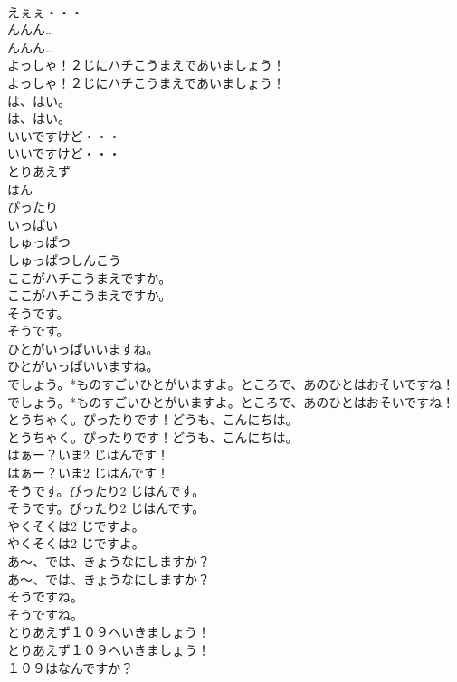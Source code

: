 \documentclass[8pt]{extreport}
\begin{document}
\begin{CJK}{UTF8}{min}
\\	えぇぇ・・・ 
\\	んんん…	
\\	んんん… 
\\	よっしゃ！２じにハチこうまえであいましょう！	
\\	よっしゃ！２じにハチこうまえであいましょう！ 
\\	は、はい。	
\\	は、はい。 
\\	いいですけど・・・	
\\	いいですけど・・・ 
\\	とりあえず
\\	はん
\\	ぴったり
\\	いっぱい
\\	しゅっぱつ
\\	しゅっぱつしんこう
\\	ここがハチこうまえですか。	
\\	ここがハチこうまえですか。 
\\	そうです。	
\\	そうです。 
\\	ひとがいっぱいいますね。	
\\	ひとがいっぱいいますね。 
\\	でしょう。*ものすごいひとがいますよ。ところで、あのひとはおそいですね！	
\\	でしょう。*ものすごいひとがいますよ。ところで、あのひとはおそいですね！ 
\\	とうちゃく。ぴったりです！どうも、こんにちは。	
\\	とうちゃく。ぴったりです！どうも、こんにちは。 
\\	はぁー？いま2 じはんです！	
\\	はぁー？いま2 じはんです！ 
\\	そうです。ぴったり2 じはんです。	
\\	そうです。ぴったり2 じはんです。 
\\	やくそくは2 じですよ。	
\\	やくそくは2 じですよ。 
\\	あ～、では、きょうなにしますか？	
\\	あ～、では、きょうなにしますか？ 
\\	そうですね。	
\\	そうですね。 
\\	とりあえず１０９へいきましょう！	
\\	とりあえず１０９へいきましょう！ 
\\	１０９はなんですか？	

\end{CJK}
\end{document}
